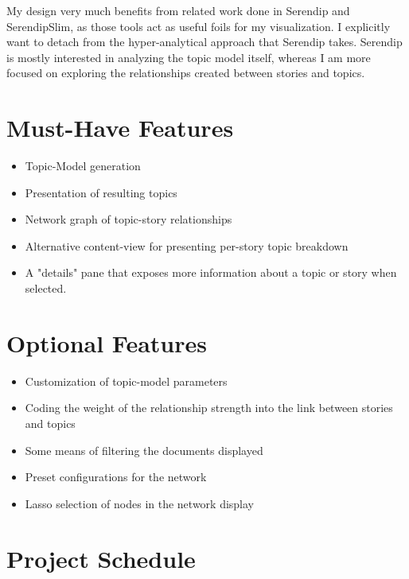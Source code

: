 My design very much benefits from related work done in Serendip and
SerendipSlim, as those tools act as useful foils for my visualization.
I explicitly want to detach from the hyper-analytical approach that
Serendip takes.  Serendip is mostly interested in analyzing the topic
model itself, whereas I am more focused on exploring the relationships
created between stories and topics.

\section{Must-Have Features}
\begin{itemize}
	\item Topic-Model generation
	\item Presentation of resulting topics
	\item Network graph of topic-story relationships
	\item Alternative content-view for presenting per-story topic 
		breakdown
	\item A "details" pane that exposes more information about a topic or
		story when selected.
\end{itemize}

\section{Optional Features}
\begin{itemize}
	\item Customization of topic-model parameters
	\item Coding the weight of the relationship strength into the link
		between stories and topics
	\item Some means of filtering the documents displayed
	\item Preset configurations for the network
	\item Lasso selection of nodes in the network display
\end{itemize}

\section{Project Schedule}

